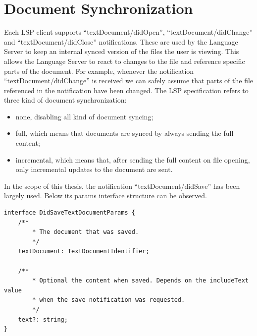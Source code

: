 \section{Document Synchronization}\label{sec:cap_sec_subsec}
Each LSP client supports ``textDocument/didOpen'', ``textDocument/didChange'' and ``textDocument/didClose'' notifications. These are used by the Language Server to keep an internal synced version of the files the user is viewing. This allows the Language Server to react to changes to the file and reference specific parts of the document. For example, whenever the notification ``textDocument/didChange'' is received we can safely assume that parts of the file referenced in the notification have been changed. The LSP specification refers to three kind of document synchronization:
\begin{itemize}
  \item none, disabling all kind of document syncing;
  \item full, which means that documents are synced by always sending the full content;
  \item incremental, which means that, after sending the full content on file opening, only incremental updates to the document are sent.
\end{itemize}
In the scope of this thesis, the notification ``textDocument/didSave'' has been largely used. Below its params interface structure can be observed. 

\clearpage

\begin{lstlisting}[caption={DidSaveTextDocumentParams interface \cite{LanguageServerProtocolWebsite}}, label={lst:block_struct}]
interface DidSaveTextDocumentParams {
	/**
		* The document that was saved.
		*/
	textDocument: TextDocumentIdentifier;

	/**
		* Optional the content when saved. Depends on the includeText value
		* when the save notification was requested.
		*/
	text?: string;
}	
\end{lstlisting}

